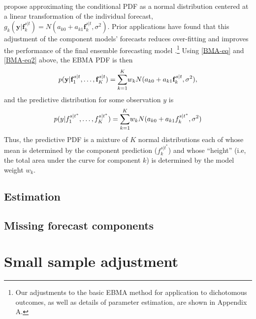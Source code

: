 \documentclass[12pt,fullpage,endnotes]{article}
\newcommand{\note}[1]{\footnote{ #1 \vspace{4 mm}}}
\begin{document}
\citet{Raftery:2005} propose approximating the conditional PDF as a
normal distribution centered at a linear transformation of the
individual forecast, $g_k(\mathbf{y}|\mathbf{f}_k^{s|t}) = N(a_{k0} +
a_{k1}\mathbf{f}_k^{s|t}, \sigma^2)$.  Prior applications have found
that this adjustment of the component models' forecasts reduces
over-fitting and improves the performance of the final ensemble
forecasting model \citep{Raftery:2005}.\note{Our adjustments to the
  basic EBMA method for application to dichotomous outcomes, as well
  as details of parameter estimation, are shown in Appendix A.}  Using
\eqref{BMA-eq} and \eqref{BMA-eq2} above, the EBMA PDF is then
\begin{equation} \small
p(\mathbf{y}|\mathbf{f}_1^{s|t}, \ldots, \mathbf{f}_K^{s|t}) = \overset{K}{\underset{k=1}{\sum}} w_k N(a_{k0} +
a_{k1}\mathbf{f}_k^{s|t}, \sigma^2),
\end{equation}
\noindent and the predictive distribution for some observation $y$ is 
\begin{equation} \small
p(y|f_1^{s|t^\ast}, \ldots, f_K^{s|t^\ast}) = \overset{K}{\underset{k=1}{\sum}} w_k N(a_{k0} +
a_{k1}f_k^{s|t^\ast}, \sigma^2)
 \end{equation}
 \noindent Thus, the predictive PDF is a mixture of $K$ normal
 distributions each of whose mean is determined by the component
 prediction ($f_k^{s|t^\ast}$) and whose ``height'' (i.e, the total
 area under the curve for component $k$) is determined by the model
 weight $w_k$.

\subsection{Estimation}

\subsection{Missing forecast components}


\section{Small sample adjustment}

\end{document}
